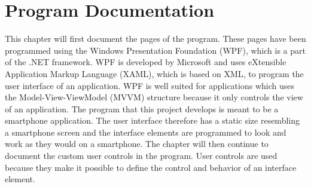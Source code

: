 \chapter{Program Documentation}
This chapter will first document the pages of the program. These pages have been programmed using the Windows Presentation Foundation (WPF), which is a part of the .NET framework. WPF is developed by Microsoft and uses eXtensible Application Markup Language (XAML), which is based on XML, to program the user interface of an application. WPF is well suited for applications which uses the Model-View-ViewModel (MVVM) structure because it only controls the view of an application. The program that this project develops is meant to be a smartphone application. The user interface therefore has a static size resembling a smartphone screen and the interface elements are programmed to look and work as they would on a smartphone. The chapter will then continue to document the custom user controls in the program. User controls are used because they make it possible to define the control and behavior of an interface element. 